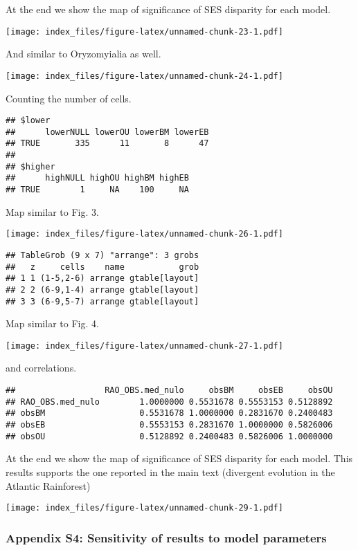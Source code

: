 \documentclass[
]{article}
\begin{document}
At the end we show the map of significance of SES disparity for each
model.

\texttt{[image: index\_files/figure-latex/unnamed-chunk-23-1.pdf]}

And similar to Oryzomyialia as well.

\texttt{[image: index\_files/figure-latex/unnamed-chunk-24-1.pdf]}

Counting the number of cells.

\begin{verbatim}
## $lower
##      lowerNULL lowerOU lowerBM lowerEB
## TRUE       335      11       8      47
## 
## $higher
##      highNULL highOU highBM highEB
## TRUE        1     NA    100     NA
\end{verbatim}

Map similar to Fig. 3.

\texttt{[image: index\_files/figure-latex/unnamed-chunk-26-1.pdf]}

\begin{verbatim}
## TableGrob (9 x 7) "arrange": 3 grobs
##   z     cells    name           grob
## 1 1 (1-5,2-6) arrange gtable[layout]
## 2 2 (6-9,1-4) arrange gtable[layout]
## 3 3 (6-9,5-7) arrange gtable[layout]
\end{verbatim}

Map similar to Fig. 4.

\texttt{[image: index\_files/figure-latex/unnamed-chunk-27-1.pdf]}

and correlations.

\begin{verbatim}
##                  RAO_OBS.med_nulo     obsBM     obsEB     obsOU
## RAO_OBS.med_nulo        1.0000000 0.5531678 0.5553153 0.5128892
## obsBM                   0.5531678 1.0000000 0.2831670 0.2400483
## obsEB                   0.5553153 0.2831670 1.0000000 0.5826006
## obsOU                   0.5128892 0.2400483 0.5826006 1.0000000
\end{verbatim}

At the end we show the map of significance of SES disparity for each
model. This results supports the one reported in the main text
(divergent evolution in the Atlantic Rainforest)

\texttt{[image: index\_files/figure-latex/unnamed-chunk-29-1.pdf]}

\hypertarget{appendix-s4-sensitivity-of-results-to-model-parameters}{%
\subsubsection{Appendix S4: Sensitivity of results to model
parameters}\label{appendix-s4-sensitivity-of-results-to-model-parameters}}
\end{document}
